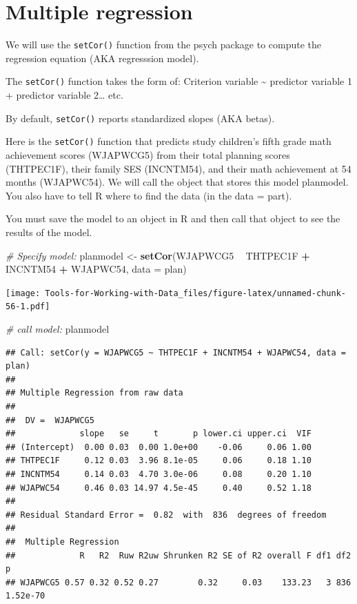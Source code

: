 \documentclass[
]{book}
\newenvironment{Shaded}{\begin{snugshade}}{\end{snugshade}}
\newcommand{\CommentTok}[1]{\textcolor[rgb]{0.56,0.35,0.01}{\textit{#1}}}
\newcommand{\DataTypeTok}[1]{\textcolor[rgb]{0.13,0.29,0.53}{#1}}
\newcommand{\KeywordTok}[1]{\textcolor[rgb]{0.13,0.29,0.53}{\textbf{#1}}}
\newcommand{\NormalTok}[1]{#1}
\newcommand{\OperatorTok}[1]{\textcolor[rgb]{0.81,0.36,0.00}{\textbf{#1}}}
\newcommand{\StringTok}[1]{\textcolor[rgb]{0.31,0.60,0.02}{#1}}
\begin{document}
\hypertarget{multiple-regression}{%
\section{Multiple regression}\label{multiple-regression}}

We will use the \texttt{setCor()} function from the psych package to compute the regression equation (AKA regresssion model).

The \texttt{setCor()} function takes the form of: Criterion variable \textasciitilde{} predictor variable 1 + predictor variable 2\ldots{} etc.

By default, \texttt{setCor()} reports standardized slopes (AKA betas).

Here is the \texttt{setCor()} function that predicts study children's fifth grade math achievement scores (WJAPWCG5) from their total planning scores (THTPEC1F), their family SES (INCNTM54), and their math achievement at 54 months (WJAPWC54). We will call the object that stores this model planmodel. You also have to tell R where to find the data (in the data = part).

You must save the model to an object in R and then call that object to see the results of the model.

\begin{Shaded}
\begin{Highlighting}[]
\CommentTok{# Specify model:}
\NormalTok{planmodel <-}\StringTok{ }\KeywordTok{setCor}\NormalTok{(WJAPWCG5 }\OperatorTok{~}\StringTok{ }\NormalTok{THTPEC1F }\OperatorTok{+}\StringTok{ }\NormalTok{INCNTM54 }\OperatorTok{+}\StringTok{ }\NormalTok{WJAPWC54, }\DataTypeTok{data =}\NormalTok{ plan)}
\end{Highlighting}
\end{Shaded}

\texttt{[image: Tools-for-Working-with-Data\_files/figure-latex/unnamed-chunk-56-1.pdf]}

\begin{Shaded}
\begin{Highlighting}[]
\CommentTok{# call model:}
\NormalTok{planmodel}
\end{Highlighting}
\end{Shaded}

\begin{verbatim}
## Call: setCor(y = WJAPWCG5 ~ THTPEC1F + INCNTM54 + WJAPWC54, data = plan)
## 
## Multiple Regression from raw data 
## 
##  DV =  WJAPWCG5 
##             slope   se     t       p lower.ci upper.ci  VIF
## (Intercept)  0.00 0.03  0.00 1.0e+00    -0.06     0.06 1.00
## THTPEC1F     0.12 0.03  3.96 8.1e-05     0.06     0.18 1.10
## INCNTM54     0.14 0.03  4.70 3.0e-06     0.08     0.20 1.10
## WJAPWC54     0.46 0.03 14.97 4.5e-45     0.40     0.52 1.18
## 
## Residual Standard Error =  0.82  with  836  degrees of freedom
## 
##  Multiple Regression
##             R   R2  Ruw R2uw Shrunken R2 SE of R2 overall F df1 df2        p
## WJAPWCG5 0.57 0.32 0.52 0.27        0.32     0.03    133.23   3 836 1.52e-70
\end{verbatim}
\end{document}
